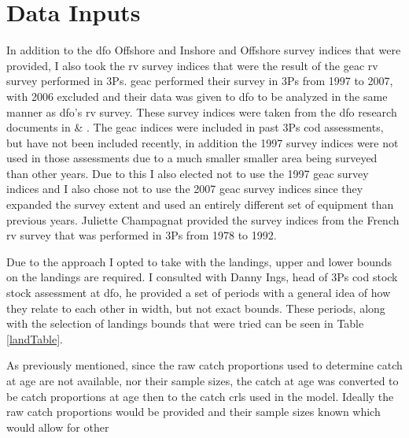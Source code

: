 \documentclass[11pt]{article}\usepackage[]{graphicx}\usepackage[]{color}
\begin{document}
\section{Data Inputs} 
In addition to the \acrshort{dfo} Offshore and Inshore and Offshore survey indices that were provided, I also took the \acrshort{rv} survey indices that were the result of the \acrfull{geac} \acrshort{rv} survey performed in 3Ps. \acrshort{geac} performed their survey in 3Ps from 1997 to 2007, with 2006 excluded and their data was given to \acrshort{dfo} to be analyzed in the same manner as \acrshort{dfo}'s \acrshort{rv} survey. These survey indices were taken from the \acrshort{dfo} research documents in \cite{mcclintock2005year} \& \cite{mcclintock2011fall}. The \acrshort{geac} indices were included in past 3Ps cod assessments, but have not been included recently, in addition the 1997 survey indices were not used in those assessments due to a much smaller smaller area being surveyed than other years\cite{brattey2005assessment}. Due to this I also elected not to use the 1997 \acrshort{geac} survey indices and I also chose not to use the 2007 \acrshort{geac} survey indices since they expanded the survey extent and used an entirely different set of equipment than previous years. Juliette Champagnat provided the survey indices from the French \acrshort{rv} survey that was performed in 3Ps from 1978 to 1992.

Due to the approach I opted to take with the landings, upper and lower bounds on the landings are required. I consulted with Danny Ings, head of 3Ps cod stock stock assessment at \acrshort{dfo}, he provided a set of periods with a general idea of how they relate to each other in width, but not exact bounds. These periods, along with the selection of landings bounds that were tried can be seen in Table \ref{landTable}. 

As previously mentioned, since the raw catch proportions used to determine catch at age are not available, nor their sample sizes, the catch at age was converted to be catch proportions at age then to the catch \acrshort{crl}s used in the model. Ideally the raw catch proportions would be provided and their sample sizes known which would allow for other 
\end{document}
